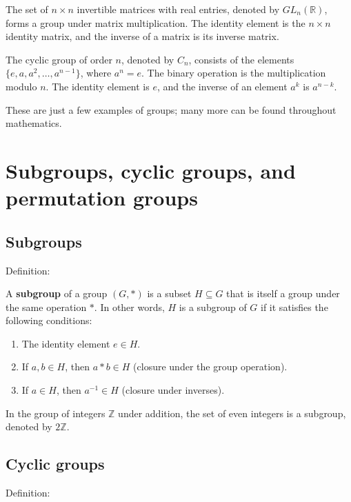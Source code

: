 \begin{example}
  The set of $n \times n$ invertible matrices with real entries, denoted by $GL_n(\mathbb{R})$, forms a group under matrix multiplication. The identity element is the $n \times n$ identity matrix, and the inverse of a matrix is its inverse matrix.
\end{example}

\begin{example}
  The cyclic group of order $n$, denoted by $C_n$, consists of the elements $\{e, a, a^2, \dots, a^{n-1}\}$, where $a^n = e$. The binary operation is the multiplication modulo $n$. The identity element is $e$, and the inverse of an element $a^k$ is $a^{n-k}$.
\end{example}

These are just a few examples of groups; many more can be found throughout mathematics.


\section{Subgroups, cyclic groups, and permutation groups}

\subsection{Subgroups}
Definition:

  A \textbf{subgroup} of a group $(G, *)$ is a subset $H \subseteq G$ that is itself a group under the same operation $*$. In other words, $H$ is a subgroup of $G$ if it satisfies the following conditions:

  \begin{enumerate}
    \item The identity element $e \in H$.
    \item If $a, b \in H$, then $a * b \in H$ (closure under the group operation).
    \item If $a \in H$, then $a^{-1} \in H$ (closure under inverses).
  \end{enumerate}

\begin{example}
  In the group of integers $\mathbb{Z}$ under addition, the set of even integers is a subgroup, denoted by $2\mathbb{Z}$.
\end{example}

\subsection{Cyclic groups}
Definition:

